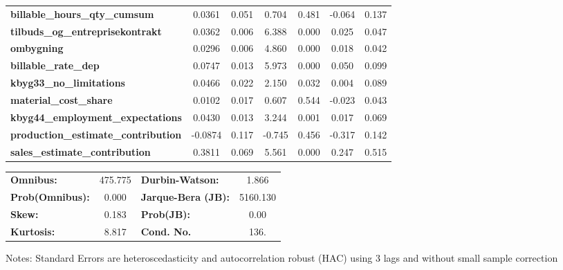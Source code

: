 \begin{center}
\begin{tabular}{lcccccc}
\textbf{billable\_hours\_qty\_cumsum}       &       0.0361  &        0.051     &     0.704  &         0.481        &       -0.064    &        0.137     \\
\textbf{tilbuds\_og\_entreprisekontrakt}    &       0.0362  &        0.006     &     6.388  &         0.000        &        0.025    &        0.047     \\
\textbf{ombygning}                          &       0.0296  &        0.006     &     4.860  &         0.000        &        0.018    &        0.042     \\
\textbf{billable\_rate\_dep}                &       0.0747  &        0.013     &     5.973  &         0.000        &        0.050    &        0.099     \\
\textbf{kbyg33\_no\_limitations}            &       0.0466  &        0.022     &     2.150  &         0.032        &        0.004    &        0.089     \\
\textbf{material\_cost\_share}              &       0.0102  &        0.017     &     0.607  &         0.544        &       -0.023    &        0.043     \\
\textbf{kbyg44\_employment\_expectations}   &       0.0430  &        0.013     &     3.244  &         0.001        &        0.017    &        0.069     \\
\textbf{production\_estimate\_contribution} &      -0.0874  &        0.117     &    -0.745  &         0.456        &       -0.317    &        0.142     \\
\textbf{sales\_estimate\_contribution}      &       0.3811  &        0.069     &     5.561  &         0.000        &        0.247    &        0.515     \\
\bottomrule
\end{tabular}
\begin{tabular}{lclc}
\textbf{Omnibus:}       & 475.775 & \textbf{  Durbin-Watson:     } &    1.866  \\
\textbf{Prob(Omnibus):} &   0.000 & \textbf{  Jarque-Bera (JB):  } & 5160.130  \\
\textbf{Skew:}          &   0.183 & \textbf{  Prob(JB):          } &     0.00  \\
\textbf{Kurtosis:}      &   8.817 & \textbf{  Cond. No.          } &     136.  \\
\bottomrule
\end{tabular}
\end{center}

Notes: \newline
 [1] Standard Errors are heteroscedasticity and autocorrelation robust (HAC) using 3 lags and without small sample correction